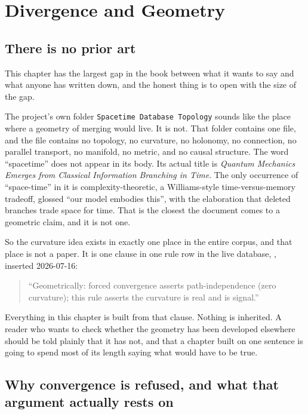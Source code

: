 \chapter{Divergence and Geometry}

\section{There is no prior art}

This chapter has the largest gap in the book between what it wants to say and what anyone has written down, and the honest thing is to open with the size of the gap.

The project's own folder \texttt{Spacetime Database Topology} sounds like the place where a geometry of merging would live. It is not. That folder contains one file, and the file contains no topology, no curvature, no holonomy, no connection, no parallel transport, no manifold, no metric, and no causal structure. The word ``spacetime'' does not appear in its body. Its actual title is \emph{Quantum Mechanics Emerges from Classical Information Branching in Time}. The only occurrence of ``space-time'' in it is complexity-theoretic, a Williams-style time-versus-memory tradeoff, glossed ``our model embodies this'', with the elaboration that deleted branches trade space for time. That is the closest the document comes to a geometric claim, and it is not one.

So the curvature idea exists in exactly one place in the entire corpus, and that place is not a paper. It is one clause in one rule row in the live database, , inserted 2026-07-16:

\begin{quote}
``Geometrically: forced convergence asserts path-independence (zero curvature); this rule asserts the curvature is real and is signal.''
\end{quote}

Everything in this chapter is built from that clause. Nothing is inherited. A reader who wants to check whether the geometry has been developed elsewhere should be told plainly that it has not, and that a chapter built on one sentence is going to spend most of its length saying what would have to be true.

\section{Why convergence is refused, and what that argument actually rests on}

